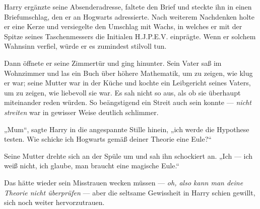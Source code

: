 Harry ergänzte seine Absenderadresse, faltete den Brief und steckte ihn in einen Briefumschlag, den er an Hogwarts adressierte. Nach weiterem Nachdenken holte er eine Kerze und versiegelte den Umschlag mit Wachs, in welches er mit der Spitze seines Taschenmessers die Initialen H.J.P.E.V. einprägte. Wenn er solchem Wahnsinn verfiel, würde er es zumindest stilvoll tun.

Dann öffnete er seine Zimmertür und ging hinunter. Sein Vater saß im Wohnzimmer und las ein Buch über höhere Mathematik, um zu zeigen, wie klug er war; seine Mutter war in der Küche und kochte ein Leibgericht seines Vaters, um zu zeigen, wie liebevoll sie war. Es sah nicht so aus, als ob sie überhaupt miteinander reden würden. So beängstigend ein Streit auch sein konnte — \emph{nicht streiten} war in gewisser Weise deutlich schlimmer.

„Mum“, sagte Harry in die angespannte Stille hinein, „ich werde die Hypothese testen. Wie schicke ich Hogwarts gemäß deiner Theorie eine Eule?“

Seine Mutter drehte sich an der Spüle um und sah ihn schockiert an.
„Ich — ich weiß nicht, ich glaube, man braucht eine magische Eule.“

Das hätte wieder sein Misstrauen wecken müssen — \emph{oh, also kann man deine Theorie nicht überprüfen} — aber die seltsame Gewissheit in Harry schien gewillt, sich noch weiter hervorzutrauen.

